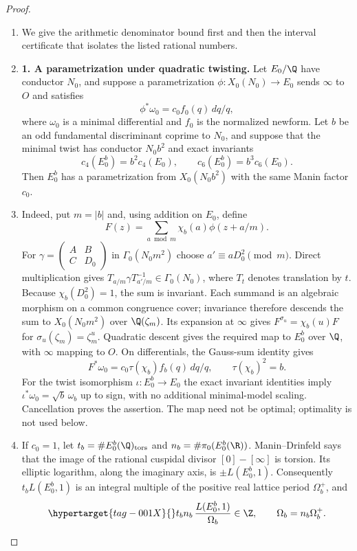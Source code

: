 \begin{proof}
\begin{enumerate}[label=\arabic*.,leftmargin=*]
\item We give the arithmetic denominator bound first and then the interval
certificate that isolates the listed rational numbers.

\item \textbf{1. A parametrization under quadratic twisting.}
Let $E_0/\Q$ have conductor $N_0$, and suppose a parametrization
$\phi:X_0(N_0)\to E_0$ sends $\infty$ to $O$ and satisfies
\[
 \phi^*\omega_0=c_0f_0(q)\,dq/q,
\]
where $\omega_0$ is a minimal differential and $f_0$ is the normalized
newform. Let $b$ be an odd fundamental discriminant coprime to $N_0$,
and suppose that the minimal twist has conductor $N_0b^2$ and exact
invariants
\[
 c_4(E_0^b)=b^2c_4(E_0),\qquad
 c_6(E_0^b)=b^3c_6(E_0).
\]
Then $E_0^b$ has a parametrization from $X_0(N_0b^2)$ with the same
Manin factor $c_0$.

\item Indeed, put $m=|b|$ and, using addition on $E_0$, define
\[
 F(z)=\sum_{a\bmod m}\chi_b(a)\phi(z+a/m).
\]
For $\gamma=\left(\begin{smallmatrix}A&B\\C&D_0\end{smallmatrix}\right)$
in $\Gamma_0(N_0m^2)$ choose $a'\equiv aD_0^2\pmod m$.
Direct multiplication gives
$T_{a/m}\gamma T_{a'/m}^{-1}\in\Gamma_0(N_0)$, where $T_t$
denotes translation by $t$. Because $\chi_b(D_0^2)=1$, the sum is
invariant. Each summand is an algebraic morphism on a common
congruence cover; invariance therefore descends the sum to
$X_0(N_0m^2)$ over $\Q(\zeta_m)$. Its expansion at $\infty$
gives $F^{\sigma_u}=\chi_b(u)F$ for
$\sigma_u(\zeta_m)=\zeta_m^u$. Quadratic descent gives the required
map to $E_0^b$ over $\Q$, with $\infty$ mapping to $O$.
On differentials, the Gauss-sum identity gives
\[
 F^*\omega_0=c_0\tau(\chi_b)f_b(q)\,dq/q,
 \qquad \tau(\chi_b)^2=b.
\]
For the twist isomorphism $\iota:E_0^b\to E_0$ the exact invariant
identities imply
$\iota^*\omega_0=\sqrt b\,\omega_b$ up to sign, with no additional
minimal-model scaling. Cancellation proves the assertion. The map
need not be optimal; optimality is not used below.

\item If $c_0=1$, let $t_b=\#E_0^b(\Q)_{\rm tors}$ and
$n_b=\#\pi_0(E_0^b(\R))$. Manin--Drinfeld says that the image of
the rational cuspidal divisor $[0]-[\infty]$ is torsion. Its elliptic
logarithm, along the imaginary axis, is $\pm L(E_0^b,1)$.
Consequently $t_bL(E_0^b,1)$ is an integral multiple of the positive
real lattice period $\Omega_b^+$, and
\begin{equation}\hypertarget{tag-001X}{}\label{ari:eq:Cgz-central-integrality}
 t_bn_b\,\frac{L(E_0^b,1)}{\Omega_b}\in\Z,
 \qquad \Omega_b=n_b\Omega_b^+.
\end{equation}


\end{enumerate}
\end{proof}
